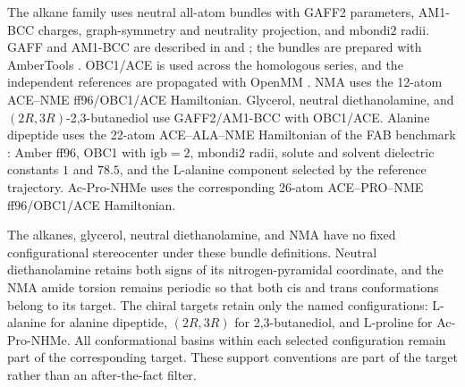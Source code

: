 \documentclass{article}
\begin{document}
The alkane family uses neutral all-atom bundles with GAFF2 parameters, AM1-BCC charges, graph-symmetry and neutrality projection, and \(\mathrm{mbondi2}\) radii. GAFF and AM1-BCC are described in \citet{wang2004gaff} and \citet{jakalian2002am1bcc}; the bundles are prepared with AmberTools \citep{case2023ambertools}. OBC1/ACE is used across the homologous series, and the independent references are propagated with OpenMM \citep{eastman2017openmm}. NMA uses the 12-atom ACE--NME ff96/OBC1/ACE Hamiltonian. Glycerol, neutral diethanolamine, and \((2R,3R)\)-2,3-butanediol use GAFF2/AM1-BCC with OBC1/ACE. Alanine dipeptide uses the 22-atom ACE--ALA--NME Hamiltonian of the FAB benchmark \citep{midgley2022flow}: Amber ff96, OBC1 with \(\mathrm{igb}=2\), \(\mathrm{mbondi2}\) radii, solute and solvent dielectric constants \(1\) and \(78.5\), and the \(\mathrm L\)-alanine component selected by the reference trajectory. Ac-Pro-NHMe uses the corresponding 26-atom ACE--PRO--NME ff96/OBC1/ACE Hamiltonian.

The alkanes, glycerol, neutral diethanolamine, and NMA have no fixed configurational stereocenter under these bundle definitions. Neutral diethanolamine retains both signs of its nitrogen-pyramidal coordinate, and the NMA amide torsion remains periodic so that both cis and trans conformations belong to its target. The chiral targets retain only the named configurations: \(\mathrm L\)-alanine for alanine dipeptide, \((2R,3R)\) for 2,3-butanediol, and \(\mathrm L\)-proline for Ac-Pro-NHMe. All conformational basins within each selected configuration remain part of the corresponding target. These support conventions are part of the target rather than an after-the-fact filter.
\end{document}
